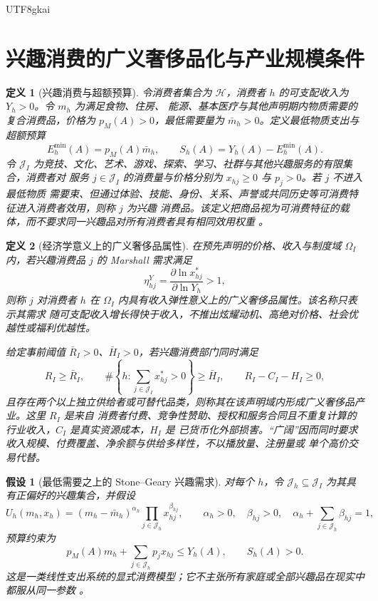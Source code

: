 \documentclass[12pt,a4paper,openany]{report}
\newtheorem{definition}{定义}[chapter]
\newtheorem{assumption}{假设}[chapter]
\begin{document}
\begin{CJK*}{UTF8}{gkai}
\section{兴趣消费的广义奢侈品化与产业规模条件}
\label{sec:interest-luxury-sector}

\begin{definition}[兴趣消费与超额预算]
令消费者集合为 \(\mathcal H\)，消费者 \(h\) 的可支配收入为 \(Y_h>0\)。令 \(m_h\) 为满足食物、住房、
能源、基本医疗与其他声明期内物质需要的复合消费品，价格为 \(p_M(A)>0\)，最低需要量为
\(\bar m_h>0\)。定义最低物质支出与超额预算
\[
  E_h^{\min}(A)=p_M(A)\bar m_h,
  \qquad
  S_h(A)=Y_h(A)-E_h^{\min}(A).
\]
令 \(\mathcal J_I\) 为竞技、文化、艺术、游戏、探索、学习、社群与其他兴趣服务的有限集合，消费者对
服务 \(j\in\mathcal J_I\) 的消费量与价格分别为 \(x_{hj}\ge0\) 与 \(p_j>0\)。若 \(j\) 不进入最低物质
需要束、但通过体验、技能、身份、关系、声誉或共同历史等可消费特征进入消费者效用，则称 \(j\) 为兴趣
消费品。该定义把商品视为可消费特征的载体，而不要求同一兴趣品对所有消费者具有相同效用权重
\cite{Lancaster1966Characteristics}。
\end{definition}

\begin{definition}[经济学意义上的广义奢侈品属性]
在预先声明的价格、收入与制度域 \(\Omega_I\) 内，若兴趣消费品 \(j\) 的 Marshall 需求满足
\[
  \eta_{hj}^{Y}
  =\frac{\partial\ln x_{hj}^{*}}{\partial\ln Y_h}>1,
\]
则称 \(j\) 对消费者 \(h\) 在 \(\Omega_I\) 内具有收入弹性意义上的广义奢侈品属性。该名称只表示其需求
随可支配收入增长得快于收入，不推出炫耀动机、高绝对价格、社会优越性或福利优越性。

给定事前阈值 \(\bar R_I>0\)、\(\bar H_I>0\)，若兴趣消费部门同时满足
\[
  R_I\ge\bar R_I,
  \qquad
  \#\left\{h:\sum_{j\in\mathcal J_I}x_{hj}^{*}>0\right\}\ge\bar H_I,
  \qquad
  R_I-C_I-H_I\ge0,
\]
且存在两个以上独立供给者或可替代品类，则称其在该声明域内形成广义奢侈品产业。这里 \(R_I\) 是来自
消费者付费、竞争性赞助、授权和服务合同且不重复计算的行业收入，\(C_I\) 是真实资源成本，\(H_I\) 是
已货币化外部损害。“广阔”因而同时要求收入规模、付费覆盖、净余额与供给多样性，不以播放量、注册量或
单个高价交易代替。
\end{definition}

\begin{assumption}[最低需要之上的 Stone--Geary 兴趣需求]
对每个 \(h\)，令 \(\mathcal J_h\subseteq\mathcal J_I\) 为其具有正偏好的兴趣集合，并假设
\[
  U_h(m_h,x_h)
  =(m_h-\bar m_h)^{\alpha_h}
  \prod_{j\in\mathcal J_h}x_{hj}^{\beta_{hj}},
  \qquad
  \alpha_h>0,
  \quad
  \beta_{hj}>0,
  \quad
  \alpha_h+\sum_{j\in\mathcal J_h}\beta_{hj}=1,
\]
预算约束为
\[
  p_M(A)m_h+
  \sum_{j\in\mathcal J_h}p_jx_{hj}\le Y_h(A),
  \qquad
  S_h(A)>0.
\]
这是一类线性支出系统的显式消费模型；它不主张所有家庭或全部兴趣品在现实中都服从同一参数
\cite{Stone1954LES}。
\end{assumption}


\end{CJK*}
\end{document}
